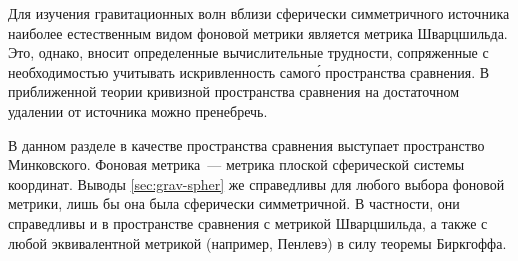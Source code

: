\documentclass[\docroot/reports/draft/report.tex]{subfiles}
\begin{document}
Для изучения гравитационных волн вблизи сферически симметричного источника наиболее естественным видом фоновой метрики является метрика Шварцшильда. Это, однако, вносит определенные вычислительные трудности, сопряженные с необходимостью учитывать искривленность самог\'{о} пространства сравнения. В приближенной теории кривизной пространства сравнения на достаточном удалении от источника можно пренебречь.

В данном разделе в качестве пространства сравнения выступает пространство Минковского. Фоновая метрика~--- метрика плоской сферической системы координат. Выводы \autoref{sec:grav-spher} же справедливы для любого выбора фоновой метрики, лишь бы она была сферически симметричной. В частности, они справедливы и в пространстве сравнения с метрикой Шварцшильда, а также с любой эквивалентной метрикой (например, Пенлевэ) в силу теоремы Биркгоффа.
\end{document}
